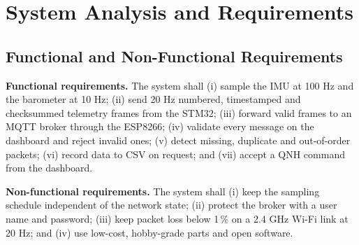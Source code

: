 \documentclass[12pt,a4paper]{report}
\begin{document}
\chapter{System Analysis and Requirements}
\section{Functional and Non-Functional Requirements}
\textbf{Functional requirements.} The system shall (i) sample the IMU at 100 Hz and the barometer at 10 Hz; (ii) send 20 Hz numbered, timestamped and checksummed telemetry frames from the STM32; (iii) forward valid frames to an MQTT broker through the ESP8266; (iv) validate every message on the dashboard and reject invalid ones; (v) detect missing, duplicate and out-of-order packets; (vi) record data to CSV on request; and (vii) accept a QNH command from the dashboard.

\textbf{Non-functional requirements.} The system shall (i) keep the sampling schedule independent of the network state; (ii) protect the broker with a user name and password; (iii) keep packet loss below 1\,\% on a 2.4 GHz Wi-Fi link at 20 Hz; and (iv) use low-cost, hobby-grade parts and open software.
\end{document}
